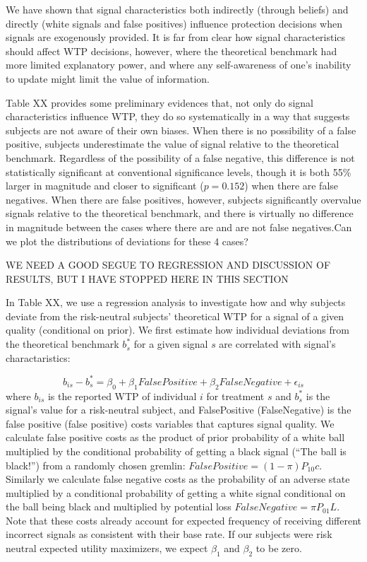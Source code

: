 \documentclass[12pt,a4paper]{article}
\newcommand{\pmt}[1]{{\color{Blue}#1}}
\begin{document}
We have shown that signal characteristics both indirectly (through beliefs) and directly (white signals and false positives) influence protection decisions when signals are exogenously provided.  It is far from clear how signal characteristics should affect WTP decisions, however, where the theoretical benchmark had more limited explanatory power, and where any self-awareness of one's inability to update might limit the value of information.

Table XX provides some preliminary evidences that, not only do signal characteristics influence WTP, they do so systematically in a way that suggests subjects are not aware of their own biases.  When there is no possibility of a false positive, subjects underestimate the value of signal relative to the theoretical benchmark.  Regardless of the possibility of a false negative, this difference is not statistically significant at conventional significance levels, though it is both 55\% larger in magnitude and closer to significant ($p=0.152$) when there are false negatives.  When there are false positives, however, subjects significantly overvalue signals relative to the theoretical benchmark, and there is virtually no difference in magnitude between the cases where there are and are not false negatives.\pmt{Can we plot the distributions of deviations for these 4 cases?}

\pmt{WE NEED A GOOD SEGUE TO REGRESSION AND DISCUSSION OF RESULTS, BUT I HAVE STOPPED HERE IN THIS SECTION}





In Table XX, we use a regression analysis to investigate how and why subjects deviate from the risk-neutral subjects’ theoretical WTP for a signal of a given quality (conditional on prior). We first estimate how individual deviations from the theoretical benchmark $b^*_s$ for a given signal $s$ are correlated with signal's charactaristics:

\[b_{is} - b^*_s = \beta_0 + \beta_1 FalsePositive + \beta_2 FalseNegative + \epsilon_{is}\]
where $b_{is}$ is the reported WTP of individual $i$ for treatment $s$ and $b^*_s$ is the signal's value for a risk-neutral subject, and FalsePositive (FalseNegative) is the false positive (false positive) costs variables that captures signal quality. We calculate false positive costs as the product of prior probability of a white ball multiplied by the conditional probability of getting a black signal (“The ball is black!”) from a randomly chosen gremlin: $FalsePositive=(1-\pi) P_{10}c$. Similarly we calculate false negative costs as the probability of an adverse state multiplied by a conditional probability of getting a white signal conditional on the ball being black and multiplied by potential loss $FalseNegative=\pi P_{01}L$. Note that these costs already account for expected frequency of receiving different incorrect signals as consistent with their base rate. If our subjects were risk neutral expected utility maximizers, we expect $\beta_1$ and $\beta_2$ to be zero.
\end{document}
